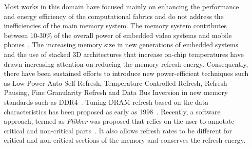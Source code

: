 Most works in this domain have focused mainly on enhancing the performance and energy efficiency of the computational fabrics and do not address the inefficiencies of the main memory system. The memory system contributes between 10-30\% of the overall power of embedded video systems and mobile phones~\cite{CarrollAaronHeiser2010}. The increasing memory size in new generations of embedded systems and the use of stacked 3D architectures that increase on-chip temperatures have drawn increasing attention on reducing the memory refresh energy. Consequently, there have been sustained efforts to introduce new power-efficient techniques such as Low Power Auto Self Refresh, Temperature Controlled Refresh, Refresh Pausing, Fine Granularity Refresh and Data Bus Inversion in new memory standards such as DDR4~\cite{jedec-sdram-standards}.  
Tuning DRAM refresh based on the data characteristics has been proposed as early as 1998~\cite{islped98}. Recently, a software approach, termed as \emph{Flikker} was proposed that relies on the user to annotate critical and non-critical parts~\cite{Liu2011}. It also allows refresh rates to be different for critical and non-critical sections of the memory and conserves the refresh energy. 
